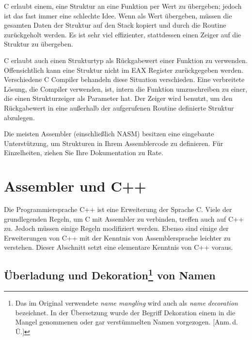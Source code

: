 C erlaubt einem, eine Struktur an eine Funktion per Wert zu
\"{u}bergeben; jedoch ist das fast immer eine schlechte Idee. Wenn als
Wert \"{u}bergeben, m\"{u}ssen die gesamten Daten der Struktur auf den Stack
kopiert und durch die Routine zur\"{u}ckgeholt werden. Es ist sehr viel
effizienter, stattdessen einen Zeiger auf die Struktur zu \"{u}bergeben.

C erlaubt auch einen Strukturtyp als R\"{u}ckgabewert einer Funktion zu
verwenden. Offensichtlich kann eine Struktur nicht im {\code EAX}
Register zur\"{u}ckgegeben werden. Verschiedene C Compiler behandeln
diese Situation verschieden. Eine verbreitete L\"{o}sung, die Compiler
verwenden, ist, intern die Funktion umzuschreiben zu einer, die
einen Strukturzeiger als Parameter hat. Der Zeiger wird benutzt, um
den R\"{u}ckgabewert in eine au{\ss}erhalb der aufgerufenen Routine
definierte Struktur abzulegen.

Die meisten Assembler (einschlie{\ss}lich NASM) besitzen eine eingebaute
Unterst\"{u}tzung, um Strukturen in Ihrem Assemblercode zu definieren.
F\"{u}r Einzelheiten, ziehen Sie Ihre Dokumentation zu Rate.



\section{Assembler und C++}

Die Programmiersprache C++ ist eine Erweiterung der Sprache C\@.
Viele der grundlegenden Regeln, um C mit Assembler zu verbinden,
treffen auch auf C++ zu. Jedoch m\"{u}ssen einige Regeln modifiziert
werden. Ebenso sind einige der Erweiterungen von C++ mit der
Kenntnis von Assemblersprache leichter zu verstehen. Dieser
Abschnitt setzt eine elementare Kenntnis von C++ voraus.

\subsection[\"{U}berladung und Dekoration von Namen] {\"{U}berladung und
Dekoration\protect\footnote{Das im Original verwendete \emph{name
mangling} wird auch als \emph{name decoration} bezeichnet. In der
\"{U}bersetzung wurde der Begriff \glq Dekoration\grq{} einem \glq in
die Mangel genommenen\grq{} oder gar \glq verst\"{u}mmelten\grq{} Namen
vorgezogen. [Anm.\,d.\,\"{U}\@.]} von Namen }

